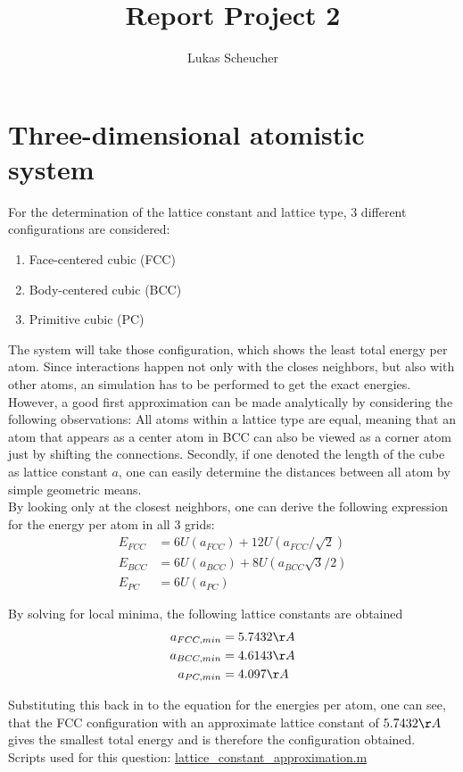 \documentclass[10pt,a4paper]{report}
\title{Report Project 2}
\author{Lukas Scheucher}
\begin{document}
\chapter{Three-dimensional atomistic system}
For the determination of the lattice constant and lattice type, 3 different configurations are considered:
\begin{enumerate}
\item Face-centered cubic (FCC)
\item Body-centered cubic (BCC)
\item Primitive cubic     (PC)
\end{enumerate}
The system will take those configuration, which shows the least total energy per atom. Since interactions happen not only with the closes neighbors, but also with other atoms, an simulation has to be performed to get the exact energies.\\
However, a good first approximation can be made analytically by considering the following observations: All atoms within a lattice type are equal, meaning that an atom that appears as a center atom in BCC can also be viewed as a corner atom just by shifting the connections. Secondly, if one denoted the length of the cube as lattice constant $a$, one can easily determine the distances between all atom by simple geometric means.\\
By looking only at the closest neighbors, one can derive the following expression for the energy per atom in all 3 grids:
\begin{align}
E_{FCC}&=6 U(a_{FCC})+12 U(a_{FCC}/\sqrt{2}) \\
E_{BCC}&=6 U(a_{BCC})+8 U(a_{BCC} \sqrt{3}/2) \\
E_{PC} &=6 U(a_{PC})
\end{align}

By solving for local minima, the following lattice constants are obtained
\begin{align}
a_{FCC,min}&= 5.7432\AA\\
a_{BCC,min}&= 4.6143\AA\\
a_{PC,min} &= 4.097\AA\\
\end{align}

Substituting this back in to the equation for the energies per atom, one can see, that the FCC configuration with an approximate lattice constant of $5.7432\AA$ gives the smallest total energy and is therefore the configuration obtained.\\

Scripts used for this question:
\href{../../lattice_constant_approximation.m}{lattice\_constant\_approximation.m}
\end{document}
